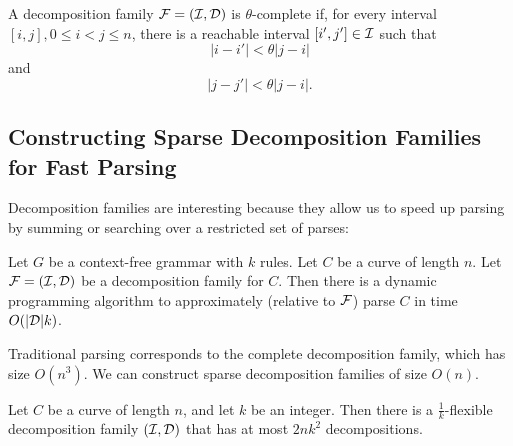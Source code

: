 \documentclass{article}
\begin{document}
\begin{defn}
  A decomposition family ${\mathcal F}=({\mathcal I},{\mathcal D})$ is $\theta$-complete if,
  for every interval $[i,j], 0\le i< j \le n$, there is a reachable
  interval $[i',j']\in {\mathcal I}$ such that
$$|i-i'| < \theta |j-i|$$
and
$$|j-j'| < \theta |j-i|.$$
\end{defn}

\subsection{Constructing Sparse Decomposition Families for Fast Parsing}

Decomposition families are interesting because they allow us to speed
up parsing by summing or searching over a restricted set of parses:
\begin{thm}
  Let $G$ be a context-free grammar with $k$ rules. Let $C$ be a
  curve of length $n$. Let ${\mathcal F}=({\mathcal I},{\mathcal D})$ be a decomposition
  family for $C$. Then there is a dynamic programming algorithm to
  approximately (relative to ${\mathcal F}$) parse $C$ in time $O(|{\mathcal D}|k)$.
\end{thm}
Traditional parsing corresponds to the complete decomposition family,
which has size $O(n^3)$. We can construct sparse decomposition
families of size $O(n)$.

\begin{thm}
  Let $C$ be a curve of length $n$, and let $k$ be an integer. Then
  there is a $\frac{1}{k}$-flexible decomposition family $({\mathcal I},{\mathcal D})$
  that has at most $2nk^2$ decompositions.
\end{thm}
\end{document}

